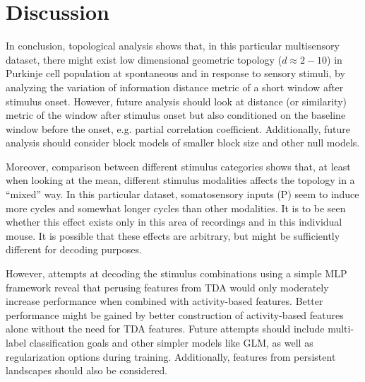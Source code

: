 \section{Discussion}

In conclusion, topological analysis shows that, in this particular multisensory dataset, there might exist low dimensional geometric topology ($d \approx 2-10$) in Purkinje cell population at spontaneous and in response to sensory stimuli, by analyzing the variation of information distance metric of a short window after stimulus onset. However, future analysis should look at distance (or similarity) metric of the window after stimulus onset but also conditioned on the baseline window before the onset, e.g. partial correlation coefficient. Additionally, future analysis should consider block models of smaller block size and other null models.

Moreover, comparison between different stimulus categories shows that, at least when looking at the mean, different stimulus modalities affects the topology in a ``mixed'' way. In this particular dataset, somatosensory inputs (P) seem to induce more cycles and somewhat longer cycles than other modalities. It is to be seen whether this effect exists only in this area of recordings and in this individual mouse. It is possible that these effects are arbitrary, but might be sufficiently different for decoding purposes.

However, attempts at decoding the stimulus combinations using a simple MLP framework reveal that perusing features from TDA would only moderately increase performance when combined with activity-based features. Better performance might be gained by better construction of activity-based features alone without the need for TDA features. Future attempts should include multi-label classification goals and other simpler models like GLM, as well as regularization options during training. Additionally, features from persistent landscapes should also be considered.
